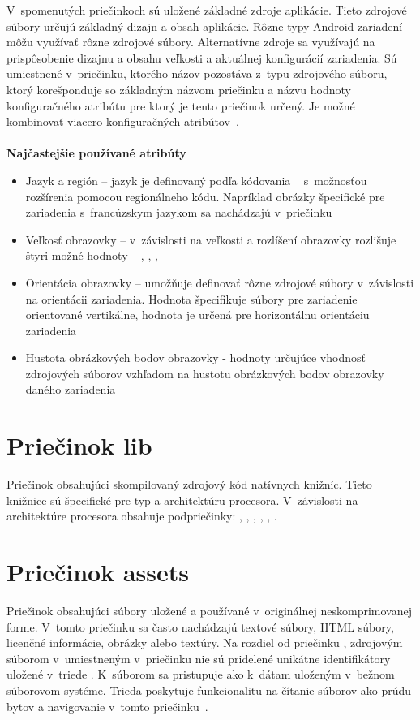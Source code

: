 \noindent V~spomenutých priečinkoch sú uložené základné zdroje aplikácie. Tieto zdrojové súbory určujú základný dizajn a obsah aplikácie. Rôzne typy Android zariadení môžu využívať rôzne zdrojové súbory. Alternatívne zdroje sa využívajú na prispôsobenie dizajnu a obsahu veľkosti a aktuálnej konfigurácií zariadenia. Sú umiestnené v~priečinku, ktorého názov pozostáva z~typu zdrojového súboru, ktorý korešponduje so základným názvom priečinku a názvu hodnoty konfiguračného atribútu pre ktorý je tento priečinok určený. Je možné kombinovať viacero konfiguračných atribútov~\cite{providingAltRes}.\\\\
\textbf{Najčastejšie používané atribúty}
\begin{itemize}
\item Jazyk a región – jazyk je definovaný podľa kódovania ~\cite{isoCodes} s~možnosťou rozšírenia pomocou  regionálneho kódu. Napríklad obrázky špecifické pre zariadenia s~francúzskym jazykom sa nachádzajú v~priečinku 
\item Veľkosť obrazovky –  v~závislosti na veľkosti a rozlíšení obrazovky rozlišuje štyri možné hodnoty -- , , , 
\item Orientácia obrazovky – umožňuje definovať rôzne zdrojové súbory v~závislosti na orientácii zariadenia. Hodnota  špecifikuje súbory pre zariadenie orientované vertikálne, hodnota  je určená pre horizontálnu orientáciu zariadenia	
\item Hustota obrázkových bodov obrazovky -  hodnoty určujúce vhodnosť zdrojových súborov vzhľadom na hustotu obrázkových bodov obrazovky daného zariadenia
\end{itemize}


\section{Priečinok lib}
\label{lib}
Priečinok obsahujúci skompilovaný zdrojový kód natívnych knižníc. Tieto knižnice sú špecifické pre typ a architektúru procesora. V~závislosti na architektúre procesora obsahuje podpriečinky: , , , , , .

\section{Priečinok assets}
\label{assets}
Priečinok obsahujúci súbory uložené a používané v~originálnej neskomprimovanej forme. V~tomto priečinku sa často nachádzajú textové súbory, HTML súbory, licenčné informácie, obrázky alebo textúry. Na rozdiel od priečinku , zdrojovým súborom v~umiestneným v~priečinku  nie sú pridelené unikátne identifikátory uložené v~triede . K~súborom sa pristupuje ako k~dátam uloženým v~bežnom súborovom systéme. Trieda  poskytuje funkcionalitu na čítanie súborov ako prúdu bytov a  navigovanie v~tomto priečinku~\cite{AssetManager}.

